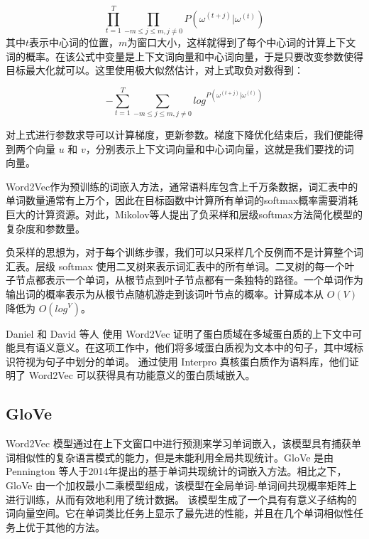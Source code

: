 \begin{equation}
   \prod \limits_{t=1}^T \prod \limits_{-m\leq j \leq m, j \neq 0} P(\omega^{(t+j)}|\omega^{(t)})
\tag{3-2}
\end{equation}
其中$t$表示中心词的位置，$m$为窗口大小，这样就得到了每个中心词的计算上下文词的概率。在该公式中变量是上下文词向量和中心词向量，于是只要改变参数使得目标最大化就可以。这里使用极大似然估计，对上式取负对数得到：

\begin{equation}
   -\sum \limits_{t=1}^T \sum \limits_{-m\leq j \leq m, j \neq 0} log^{P(\omega^{(t+j)}|\omega^{(t)})}
\tag{3-3}
\end{equation}

对上式进行参数求导可以计算梯度，更新参数。梯度下降优化结束后，我们便能得到两个向量 $u$ 和 $v$，分别表示上下文词向量和中心词向量，这就是我们要找的词向量。

Word2Vec作为预训练的词嵌入方法，通常语料库包含上千万条数据，词汇表中的单词数量通常有上万个，因此在目标函数中计算所有单词的softmax概率需要消耗巨大的计算资源。对此，Mikolov等人提出了负采样和层级softmax方法简化模型的复杂度和参数量。

负采样的思想为，对于每个训练步骤，我们可以只采样几个反例而不是计算整个词汇表。层级 softmax 使用二叉树来表示词汇表中的所有单词。二叉树的每一个叶子节点都表示一个单词，从根节点到叶子节点都有一条独特的路径。一个单词作为输出词的概率表示为从根节点随机游走到该词叶节点的概率。计算成本从 $O(V)$ 降低为 $O(log^{V})$。

Daniel 和 David 等人 \cite{buchan2019inferring} 使用 Word2Vec 证明了蛋白质域在多域蛋白质的上下文中可能具有语义意义。在这项工作中，他们将多域蛋白质视为文本中的句子，其中域标识符视为句子中划分的单词。 通过使用 Interpro \cite{finn2017interpro} 真核蛋白质作为语料库，他们证明了 Word2Vec 可以获得具有功能意义的蛋白质域嵌入。


\subsection{GloVe}
Word2Vec 模型通过在上下文窗口中进行预测来学习单词嵌入，该模型具有捕获单词相似性的复杂语言模式的能力，但是未能利用全局共现统计。GloVe \cite{pennington2014glove} 是由 Pennington 等人于2014年提出的基于单词共现统计的词嵌入方法。相比之下，GloVe 由一个加权最小二乘模型组成，该模型在全局单词-单词间共现概率矩阵上进行训练，从而有效地利用了统计数据。 该模型生成了一个具有有意义子结构的词向量空间。它在单词类比任务上显示了最先进的性能，并且在几个单词相似性任务上优于其他的方法。


